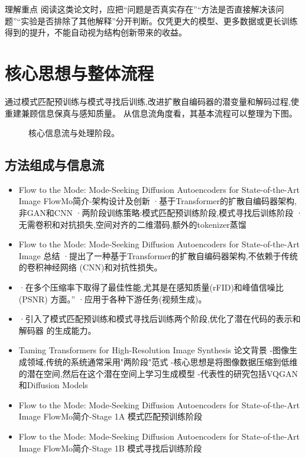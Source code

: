 \documentclass[UTF8,11pt,a4paper]{ctexart}
\begin{document}
\begin{notebox}{理解重点}
阅读这类论文时，应把“问题是否真实存在”“方法是否直接解决该问题”“实验是否排除了其他解释”分开判断。仅凭更大的模型、更多数据或更长训练得到的提升，不能自动视为结构创新带来的收益。
\end{notebox}

\section{核心思想与整体流程}
通过模式匹配预训练与模式寻找后训练,改进扩散自编码器的潜变量和解码过程,使重建兼顾信息保真与感知质量。 从信息流角度看，其基本流程可以整理为下图。

\begin{figure}[H]
\centering
{}
\caption{核心信息流与处理阶段。}
\end{figure}

\subsection{方法组成与信息流}
\begin{itemize}
\item Flow to the Mode: Mode-Seeking Diffusion Autoencoders for State-of-the-Art Image FlowMo简介-架构设计及创新 ·基于Transformer的扩散自编码器架构,非GAN和CNN ·两阶段训练策略:模式匹配预训练阶段,模式寻找后训练阶段 ·无需卷积和对抗损失,空间对齐的二维潜码,额外的tokenizer蒸馏
\item Flow to the Mode: Mode-Seeking Diffusion Autoencoders for State-of-the-Art Image 总结 ·提出了一种基于Transformer的扩散自编码器架构,不依赖于传统的卷积神经网络 (CNN)和对抗性损失。
\item ·在多个压缩率下取得了最佳性能,尤其是在感知质量(rFID)和峰值信噪比(PSNR) 方面。” ·应用于各种下游任务(视频生成)。
\item ·引入了模式匹配预训练和模式寻找后训练两个阶段,优化了潜在代码的表示和解码器 的生成能力。
\item Taming Transformers for High-Resolution Image Synthesis 论文背景 -图像生成领域,传统的系统通常采用"两阶段"范式 -核心思想是将图像数据压缩到低维的潜在空间,然后在这个潜在空间上学习生成模型 -代表性的研究包括VQGAN和Diffusion Models
\item Flow to the Mode: Mode-Seeking Diffusion Autoencoders for State-of-the-Art Image FlowMo简介-Stage 1A 模式匹配预训练阶段
\item Flow to the Mode: Mode-Seeking Diffusion Autoencoders for State-of-the-Art Image FlowMo简介-Stage 1B 模式寻找后训练阶段
\end{itemize}
\end{document}
